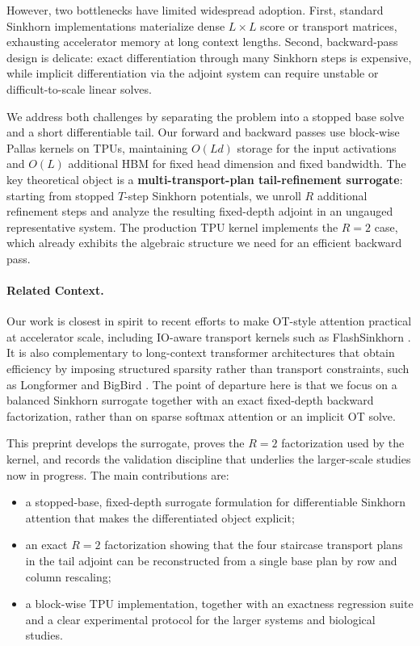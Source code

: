 \documentclass{article}
\begin{document}
However, two bottlenecks have limited widespread adoption. First, standard Sinkhorn implementations materialize dense $L \times L$ score or transport matrices, exhausting accelerator memory at long context lengths. Second, backward-pass design is delicate: exact differentiation through many Sinkhorn steps is expensive, while implicit differentiation via the adjoint system \citep{luise2018differential, bai2019deep} can require unstable or difficult-to-scale linear solves.

We address both challenges by separating the problem into a stopped base solve and a short differentiable tail. Our forward and backward passes use block-wise Pallas kernels on TPUs, maintaining $O(Ld)$ storage for the input activations and $O(L)$ additional HBM for fixed head dimension and fixed bandwidth. The key theoretical object is a \textbf{multi-transport-plan tail-refinement surrogate}: starting from stopped $T$-step Sinkhorn potentials, we unroll $R$ additional refinement steps and analyze the resulting fixed-depth adjoint in an ungauged representative system. The production TPU kernel implements the $R=2$ case, which already exhibits the algebraic structure we need for an efficient backward pass.

\paragraph{Related Context.}
Our work is closest in spirit to recent efforts to make OT-style attention practical at accelerator scale, including IO-aware transport kernels such as FlashSinkhorn \citep{flashsinkhorn2024}. It is also complementary to long-context transformer architectures that obtain efficiency by imposing structured sparsity rather than transport constraints, such as Longformer \citep{beltagy2020longformer} and BigBird \citep{zaheer2020bigbird}. The point of departure here is that we focus on a balanced Sinkhorn surrogate together with an exact fixed-depth backward factorization, rather than on sparse softmax attention or an implicit OT solve.

This preprint develops the surrogate, proves the $R=2$ factorization used by the kernel, and records the validation discipline that underlies the larger-scale studies now in progress. The main contributions are:

\begin{itemize}
    \item a stopped-base, fixed-depth surrogate formulation for differentiable Sinkhorn attention that makes the differentiated object explicit;
    \item an exact $R=2$ factorization showing that the four staircase transport plans in the tail adjoint can be reconstructed from a single base plan by row and column rescaling;
    \item a block-wise TPU implementation, together with an exactness regression suite and a clear experimental protocol for the larger systems and biological studies.
\end{itemize}
\end{document}
